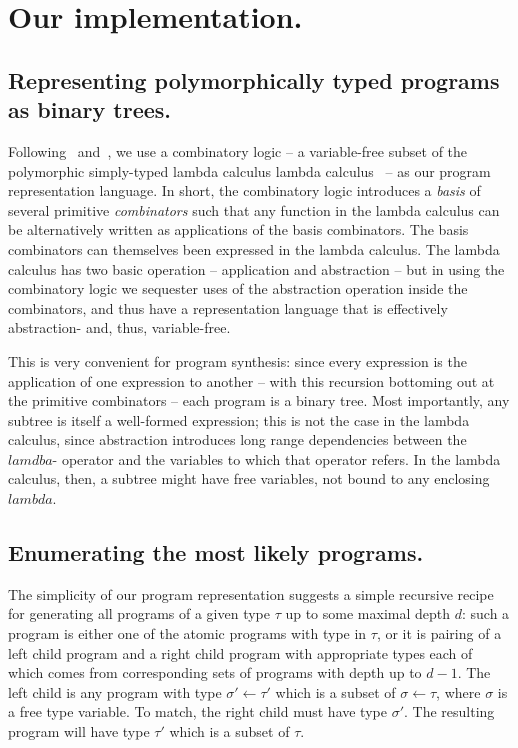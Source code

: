 \documentclass{article}
\begin{document}
\section{Our implementation.}

\subsection{Representing polymorphically typed programs as binary trees.}

Following~\cite{liang10programs} and~\cite{Briggs:2008}, we use a
combinatory logic -- a variable-free subset of the polymorphic
simply-typed lambda calculus lambda calculus~\cite{Pierce_2002} -- as
our program representation language. In short, the combinatory logic
introduces a \emph{basis} of several primitive \emph{combinators} such
that any function in the lambda calculus can be alternatively written
as applications of the basis combinators. The basis combinators can
themselves been expressed in the lambda calculus. The lambda calculus
has two basic operation -- application and abstraction -- but in using
the combinatory logic we sequester uses of the abstraction operation
inside the combinators, and thus have a representation language that
is effectively abstraction- and, thus, variable-free. 

This is very convenient for program synthesis: since every expression
is the application of one expression to another -- with this recursion
bottoming out at the primitive combinators -- each program is a binary
tree. Most importantly, any subtree is itself a well-formed
expression; this is not the case in the lambda calculus, since
abstraction introduces long range dependencies between the $lamdba$-
operator and the variables to which that operator refers. In the
lambda calculus, then, a subtree might have free variables, not bound
to any enclosing $lambda$. 

\subsection{Enumerating the most likely programs.}
The simplicity of our program representation suggests a simple
recursive recipe for generating all programs of a given type $\tau$ up
to some maximal depth $d$: such a program is either one of the atomic
programs with type in $\tau$, or it is pairing of a left child program
and a right child program with appropriate types each of which comes
from corresponding sets of programs with depth up to $d-1$. The left
child is any program with type $\sigma' \leftarrow \tau'$ which is a
subset of $\sigma \leftarrow \tau$, where $\sigma$ is a free type
variable. To match, the right child must have type $\sigma'$. The
resulting program will have type $\tau'$ which is a subset of $\tau$.
\end{document}
